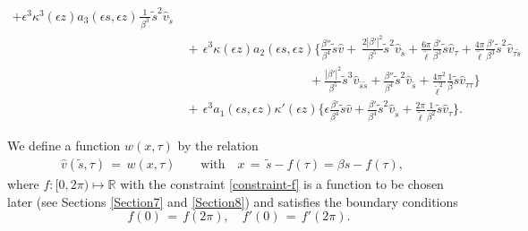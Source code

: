 \documentclass[10pt, reqno]{amsart}
\numberwithin{equation}{section}
\theoremstyle{definition}
\begin{document}
{\begin{align}
 +\epsilon^3 \kappa^3(\epsilon z) a_3(\epsilon s, \epsilon z) \frac{1}{\, \beta^3\, }{\tilde s}^2{\hat v}_{\tilde s}
\nonumber\\[2mm]
&\,+\,
\epsilon^3 \kappa(\epsilon z) a_2(\epsilon s, \epsilon z)
\Bigg\{
\frac{\beta''} {\beta^4} {\tilde s} {\hat v}
+\,\frac{2|\beta'|^2}{\beta^5} {\tilde s}^2 {\hat v}_{\tilde s}
+\frac{ 6\pi}{ {\tilde\ell}}\frac{\beta'} {\beta^3} {\tilde s}{\hat v}_\tau
+\frac{ 4\pi}{ {\tilde\ell}}\frac{\beta'} {\beta^3} {\tilde s}^2{\hat v}_{\tau \tilde s }
\nonumber\\[2mm]
&\qquad\qquad\qquad\qquad\qquad
+ \frac{|\beta'|^2}{\beta^5} {\tilde s}^3{\hat v}_{{\tilde s}{\tilde s}}
+ \frac{\beta''}{\beta^4} {\tilde s}^2 {\hat v}_{\tilde s}
+\frac{ 4\pi^2} {{\tilde\ell}^2}\frac{1}{\beta} {\tilde s}{\hat v}_{\tau\tau}\Bigg\}
\nonumber\\[2mm]
&\,+\,
\epsilon^3a_1(\epsilon s, \epsilon z) \kappa'(\epsilon z)
\Bigg\{
\epsilon\frac{\beta'}{\beta^4} {\tilde s}{\hat v}
+\frac{\beta'}{\beta^4} {\tilde s}^2 {\hat v}_{\tilde s}
+\frac{ 2\pi}{ {\tilde\ell}}\frac{1}{ \beta^2} {\tilde s}{\hat v}_\tau
\Bigg\}.
\label{B2tildev}
\end{align}




We define a function $w (x, \tau) $ by the relation
\begin{align} \label{definition of x 2.14}
{\hat v}({\tilde s}, \tau) \,=\, w(x, \tau)
\qquad \text{with}\quad
x \,=\, {\tilde s}-f(\tau) = \beta s- f(\tau),
\end{align}
where $f :[0, 2\pi) \mapsto{\mathbb R}$ with the constraint \eqref{constraint-f} is a function to be chosen later (see Sections \ref{Section7} and \ref{Section8}) and satisfies the boundary conditions
$$
\quad f(0) \,=\, f(2\pi), \quad f'(0) \,=\, f'(2\pi).
$$


}
\end{document}
